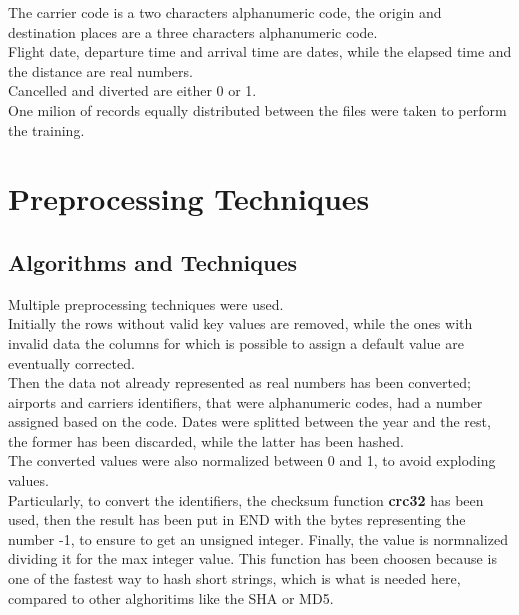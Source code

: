 \documentclass[
	letterpaper, %
	10pt, %
]{class}
\begin{document}
The carrier code is a two characters alphanumeric code, the origin and destination places are a three characters alphanumeric code.\\
Flight date, departure time and arrival time are dates, while the elapsed time and the distance are real numbers.\\
Cancelled and diverted are either 0 or 1.\\

One milion of records equally distributed between the files were taken to perform the training.


\section{Preprocessing Techniques}

\subsection{Algorithms and Techniques}

Multiple preprocessing techniques were used.\\

Initially the rows without valid key values are removed, while the ones with invalid data the columns for which is possible to assign a default value are eventually corrected.\\

Then the data not already represented as real numbers has been converted; airports and carriers identifiers, that were alphanumeric codes, had a number assigned based on the code. Dates were splitted between the year and the rest, the former has been discarded, while the latter has been hashed.\\

The converted values were also normalized between 0 and 1, to avoid exploding values.\\

Particularly, to convert the identifiers, the checksum function \textbf{crc32} has been used, then the result has been put in END with the bytes representing the number -1, to ensure to get an unsigned integer. Finally, the value is normnalized dividing it for the max integer value.
This function has been choosen because is one of the fastest way to hash short strings, which is what is needed here, compared to other alghoritims like the SHA or MD5.\\
\end{document}
